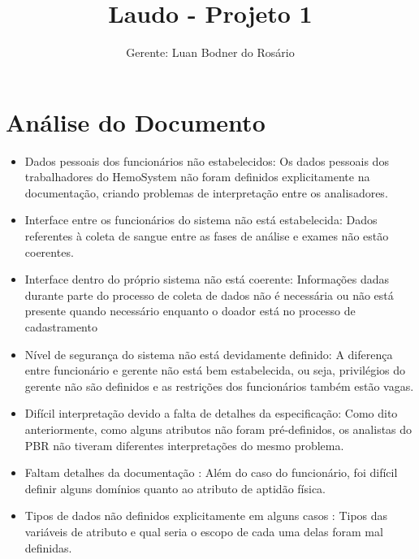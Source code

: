 \documentclass[12pt,a4paper,final]{report}
\author{Gerente: Luan Bodner do Rosário}
\title{Laudo - Projeto 1}
\begin{document}
\maketitle
\section*{Análise do Documento}
\begin{itemize}
\item Dados pessoais dos funcionários não estabelecidos: Os dados pessoais dos trabalhadores do HemoSystem não foram definidos explicitamente na documentação, criando problemas de interpretação entre os analisadores.

\item Interface entre os funcionários do sistema não está estabelecida: Dados referentes à coleta de sangue entre as fases de análise e exames não estão coerentes.

\item Interface dentro do próprio sistema não está coerente: Informações dadas durante parte do processo de coleta de dados não é necessária ou não está presente quando necessário enquanto o doador está no processo de cadastramento

\item Nível de segurança do sistema não está devidamente definido: A diferença entre funcionário e gerente não está bem estabelecida, ou seja, privilégios do gerente não são definidos e as restrições dos funcionários também estão vagas.

\item Difícil interpretação devido a falta de detalhes da especificação: Como dito anteriormente, como alguns atributos não foram pré-definidos, os analistas do PBR não tiveram diferentes interpretações do mesmo problema.

\item Faltam detalhes da documentação : Além do caso do funcionário, foi difícil definir alguns domínios quanto ao atributo de aptidão física.

\item Tipos de dados não definidos explicitamente em alguns casos : Tipos das variáveis de atributo e qual seria o escopo de cada uma delas foram mal definidas.
\end{itemize}
\newpage
\end{document}
